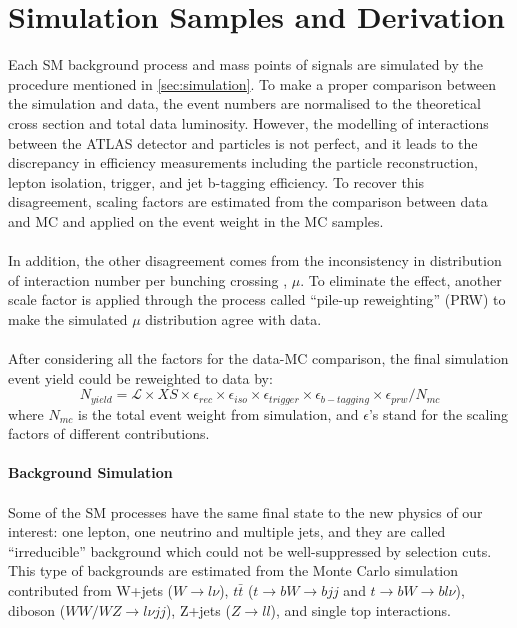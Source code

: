 \section{Simulation Samples and Derivation}
Each SM background process and mass points of signals are simulated by the procedure mentioned in \ref{sec:simulation}.  To make a proper comparison between the simulation and data, the event numbers are normalised to the theoretical cross section and total data luminosity. However, the modelling of interactions between the ATLAS detector and particles is not perfect, and it leads to the discrepancy in efficiency measurements including the particle reconstruction, lepton isolation, trigger, and jet b-tagging efficiency. To recover this disagreement, scaling factors are estimated from the comparison between data and MC and applied on the event weight in the MC samples. 
\\
\\In addition, the other disagreement comes from the inconsistency in distribution of interaction number per bunching crossing , $\mu$. To eliminate the effect, another scale factor is applied through the process called ``pile-up reweighting'' (PRW) to make the simulated $\mu$ distribution agree with data. 
\\
\\After considering all the factors for the data-MC comparison, the final simulation event yield could be reweighted to data by:
\begin{equation}
N_{yield} = \mathcal{L}\times XS \times \epsilon_{rec} \times \epsilon_{iso} \times \epsilon_{trigger} \times \epsilon_{b-tagging} \times \epsilon_{prw} / N_{mc}
\end{equation}
where $N_{mc}$ is the total event weight from simulation, and $\epsilon$'s stand for the scaling factors of different contributions. 
\\
\\{\bf Background Simulation}
\\
\\Some of the SM processes have the same final state to the new physics of our interest: one lepton, one neutrino and multiple jets, and they are called ``irreducible'' background which could not be well-suppressed by selection cuts. This type of backgrounds are estimated from the Monte Carlo simulation contributed from W+jets ($W\rightarrow l\nu$), $t\bar{t}$ ($t\rightarrow bW \rightarrow bjj$ and $t\rightarrow bW \rightarrow bl\nu$), diboson ($WW/WZ\rightarrow l\nu jj$), Z+jets ($Z\rightarrow ll$), and single top interactions.  
